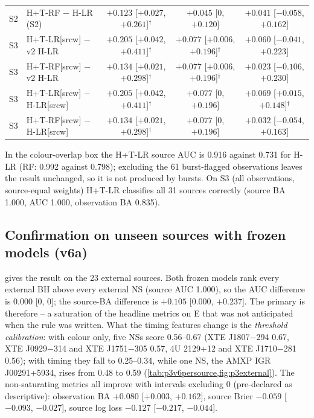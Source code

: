 \begin{table}[htbp]
\begin{tabular}{@{}llccc@{}}
S2 & H+T-RF $-$ H-LR (S2) & $+0.123$ [$+0.027$, $+0.261$]$^\dagger$ & $+0.045$ [0, $+0.120$] & $+0.041$ [$-0.058$, $+0.162$] \\
S3 & H+T-LR[srcw] $-$ v2 H-LR & $+0.205$ [$+0.042$, $+0.411$]$^\dagger$ & $+0.077$ [$+0.006$, $+0.196$]$^\dagger$ & $+0.060$ [$-0.041$, $+0.223$] \\
S3 & H+T-RF[srcw] $-$ v2 H-LR & $+0.134$ [$+0.021$, $+0.298$]$^\dagger$ & $+0.077$ [$+0.006$, $+0.196$]$^\dagger$ & $+0.023$ [$-0.106$, $+0.230$] \\
S3 & H+T-LR[srcw] $-$ H-LR[srcw] & $+0.205$ [$+0.042$, $+0.411$]$^\dagger$ & $+0.077$ [0, $+0.196$] & $+0.069$ [$+0.015$, $+0.148$]$^\dagger$ \\
S3 & H+T-RF[srcw] $-$ H-LR[srcw] & $+0.134$ [$+0.021$, $+0.298$]$^\dagger$ & $+0.077$ [0, $+0.196$] & $+0.032$ [$-0.054$, $+0.163$] \\
\bottomrule
\end{tabular}
\end{table}

In the colour-overlap box the H+T-LR source AUC is 0.916 against 0.731 for H-LR (RF: 0.992 against 0.798); excluding
the 61 burst-flagged observations leaves the result unchanged, so it is not produced by bursts. On S3 (all observations,
source-equal weights) H+T-LR classifies all 31 sources correctly (source BA 1.000, AUC 1.000, observation BA 0.835).

\subsection{Confirmation on unseen sources with frozen models (v6a)}\label{sec:p3v6a}
\Primary{}  gives the result on the 23 external sources. Both frozen models rank every external BH
above every external NS (source AUC 1.000), so the AUC difference is $0.000$ [0, 0]; the source-BA difference is
$+0.105$ [0.000, $+0.237$]. The primary is therefore \NotDetected{} -- a saturation of the headline metrics on E that was
not anticipated when the rule was written. What the timing features change is the \emph{threshold calibration}: with
colour only, five NSs score 0.56--0.67 (XTE J1807$-$294 0.67, XTE J0929$-$314 and XTE J1751$-$305 0.57, 4U 2129+12 and
XTE J1710$-$281 0.56); with timing they fall to 0.25--0.34, while one NS, the AMXP IGR J00291+5934, rises from 0.48 to 0.59
(\cref{tab:p3v6persource,fig:p3external}). The non-saturating metrics all improve with intervals excluding 0 (pre-declared
as descriptive): observation BA $+0.080$ [$+0.003$, $+0.162$], source Brier $-0.059$ [$-0.093$, $-0.027$], source log
loss $-0.127$ [$-0.217$, $-0.044$].


